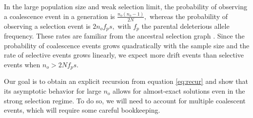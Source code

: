 \documentclass[review]{elsarticle}
\newcommand{\ra}{\rightarrow}
\newcommand{\ikcomment}[1]{\textcolor{blue}{IK: #1}}
\begin{document}
In the large population size and weak selection limit, the probability of observing a coalescence event 
in a generation is $\frac{n_o(n_o-1)}{2 N},$ whereas the probability of observing a selection event is
$2 n_o f_p s,$ with $f_p$ the parental deleterious allele frequency. These rates are familiar from the 
ancestral selection graph  \citep{KroneNeuhauser1997}. 
Since the probability of coalescence events grows quadratically with the sample size and the 
rate of selective events grows linearly, we expect  more drift events than selective events when 
$n_o>2Nf_p s.$ 






%


Our goal is to obtain an explicit recursion from equation \eqref{eq:recur} and show that its asymptotic
 behavior for large $n_o$ allows for almost-exact solutions even in the strong selection regime. 
 To do so, we will need to account for multiple coalescent events, which will require some careful bookkeeping.

\end{document}

